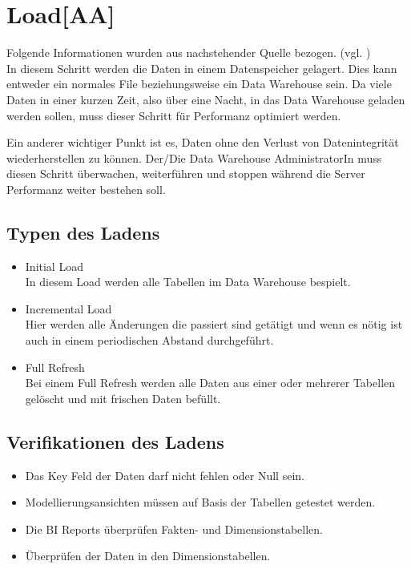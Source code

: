 \newpage
\section{Load[AA]}\label{sec:load}
Folgende Informationen wurden aus nachstehender Quelle bezogen. (vgl. \cite{guru_etl_2020}) \\

In diesem Schritt werden die Daten in einem Datenspeicher gelagert. Dies kann entweder ein normales File beziehungsweise ein Data Warehouse sein. Da viele Daten in einer kurzen Zeit, also über eine Nacht, in das Data Warehouse geladen werden sollen, muss dieser Schritt für Performanz optimiert werden.

Ein anderer wichtiger Punkt ist es, Daten ohne den Verlust von Datenintegrität wiederherstellen zu können. Der/Die Data Warehouse AdministratorIn muss diesen Schritt überwachen, weiterführen und stoppen während die Server Performanz weiter bestehen soll.
\subsection{Typen des Ladens}
\begin{itemize}
\item Initial Load \mbox{} \\
In diesem Load werden alle Tabellen im Data Warehouse bespielt.
\item Incremental Load \mbox{} \\
Hier werden alle Änderungen die passiert sind getätigt und wenn es nötig ist auch in einem periodischen Abstand durchgeführt.
\item Full Refresh \mbox{} \\
Bei einem Full Refresh werden alle Daten aus einer oder mehrerer Tabellen gelöscht und mit frischen Daten befüllt.
\end{itemize}
\subsection{Verifikationen des Ladens}
\begin{itemize}
\item Das Key Feld der Daten darf nicht fehlen oder Null sein.
\item Modellierungsansichten müssen auf Basis der Tabellen getestet werden.
\item Die BI Reports überprüfen Fakten- und Dimensionstabellen.
\item Überprüfen der Daten in den Dimensionstabellen.
\end{itemize}